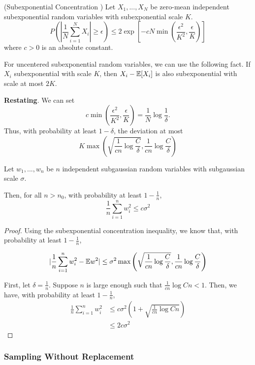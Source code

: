 \begin{proposition} (Subexponential Concentration \cite{vershynin2010introduction})
Let $X_1,...,X_N$ be zero-mean independent subexponential random variables with subexponential scale $K$. 
\[
P( | \frac{1}{N} \sum_{i=1}^N X_i | \geq \epsilon) \leq
	2 \exp \left[ -c N \min\left( \frac{\epsilon^2}{K^2}, \frac{\epsilon}{K} \right) \right]
\]
where $c > 0$ is an absolute constant.
\end{proposition}

For uncentered subexponential random variables, we can use the following fact. If $X_i$ subexponential with scale $K$, then $X_i - {\mathbb E}[X_i]$ is also subexponential with scale at most $2K$.

\textbf{Restating}. We can set
\[
c \min\left( \frac{\epsilon^2}{K^2}, \frac{\epsilon}{K} \right) = \frac{1}{N} \log \frac{1}{\delta}.
\]
Thus, with probability at least $1-\delta$, the deviation at most
\[
K \max\left( \sqrt{\frac{1}{cn} \log \frac{C}{\delta}},  \frac{1}{cn} \log \frac{C}{\delta} \right)
\]


\begin{corollary}
Let $w_1,...,w_n$ be $n$ independent subgaussian random variables with subgaussian scale $\sigma$. 

Then, for all $n > n_0$, with probability at least $1- \frac{1}{n}$,
\[
\frac{1}{n} \sum_{i=1}^n w_i^2 \leq c \sigma^2 
\]
\end{corollary}

\begin{proof}
Using the subexponential concentration inequality, we know that, with probability at least $1-\frac{1}{n}$, 

\[
| \frac{1}{n} \sum_{i=1}^n w_i^2 - {\mathbb E} w^2 | \leq \sigma^2 \max\left( \sqrt{\frac{1}{cn} \log \frac{C}{\delta}}, \frac{1}{cn}\log \frac{C}{\delta} \right)
\]

First, let $\delta = \frac{1}{n}$. Suppose $n$ is large enough such that $ \frac{1}{cn} \log Cn < 1$. Then, we have, with probability at least $1-\frac{1}{n}$,
\begin{align*}
 \frac{1}{n} \sum_{i=1}^n w_i^2 &\leq c\sigma^2 (1+\sqrt{\frac{1}{cn} \log Cn}) \\
		&\leq 2 c \sigma^2
 \end{align*}
 
\end{proof}

\subsubsection{Sampling Without Replacement}

